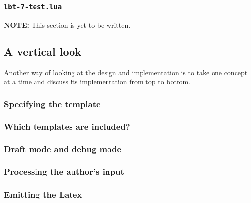 \documentclass[11pt]{article}
\begin{document}
\subsubsection{\texttt{lbt-7-test.lua}}

\textbf{NOTE:} This section is yet to be written.


\subsection{A vertical look}

Another way of looking at the design and implementation is to take one concept at a time and discuss its implementation from top to bottom.


\subsubsection{Specifying the template}


\subsubsection{Which templates are included?}


\subsubsection{Draft mode and debug mode}


\subsubsection{Processing the author's input}


\subsubsection{Emitting the Latex}
\end{document}
